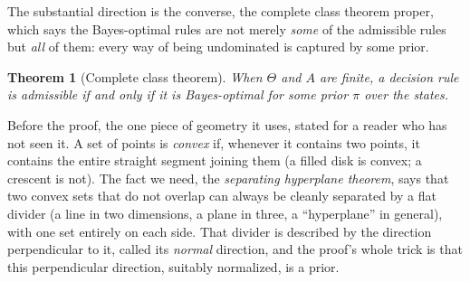 \documentclass[10pt]{article}
\newtheorem{theorem}{Theorem}[section]
\theoremstyle{definition}
\theoremstyle{remark}
\begin{document}
The substantial direction is the converse, the complete class theorem proper, which says the Bayes-optimal rules are not merely \emph{some} of the admissible rules but \emph{all} of them: every way of being undominated is captured by some prior.

\begin{theorem}[Complete class theorem]
\label{thm:cc}
When $\Theta$ and $A$ are finite, a decision rule is admissible if and only if it is Bayes-optimal for some prior $\pi$ over the states.
\end{theorem}

Before the proof, the one piece of geometry it uses, stated for a reader who has not seen it. A set of points is \emph{convex} if, whenever it contains two points, it contains the entire straight segment joining them (a filled disk is convex; a crescent is not). The fact we need, the \emph{separating hyperplane theorem}, says that two convex sets that do not overlap can always be cleanly separated by a flat divider (a line in two dimensions, a plane in three, a ``hyperplane'' in general), with one set entirely on each side. That divider is described by the direction perpendicular to it, called its \emph{normal} direction, and the proof's whole trick is that this perpendicular direction, suitably normalized, is a prior.
\end{document}
